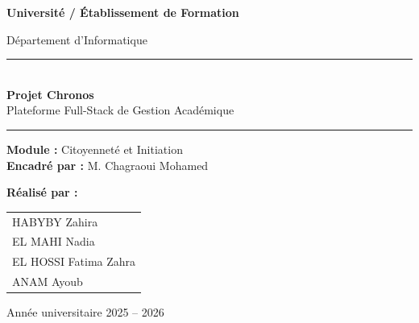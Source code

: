 \documentclass[12pt, a4paper]{report}
\begin{document}
\begin{titlepage}
    \centering
    \vspace*{2cm}
    
    {\Large\sffamily\bfseries Université / Établissement de Formation\par}
    \vspace{0.3cm}
    {\large\sffamily Département d'Informatique\par}
    
    \vspace{2cm}
    
    \rule{\textwidth}{1.5pt}\\[0.5cm]
    {\fontsize{36}{42}\selectfont\sffamily\bfseries\color{NavyBlue} Projet Chronos}\\[0.3cm]
    {\Large\sffamily Plateforme Full-Stack de Gestion Académique}\\[0.5cm]
    \rule{\textwidth}{1.5pt}
    
    \vspace{1.5cm}
    
    {\large\sffamily\bfseries Module :} {\large\sffamily Citoyenneté et Initiation}\\[0.3cm]
    {\large\sffamily\bfseries Encadré par :} {\large\sffamily M. Chagraoui Mohamed}
    
    \vspace{2cm}
    
    {\large\sffamily\bfseries Réalisé par :}\\[0.4cm]
    \begin{tabular}{l}
        \large\sffamily HABYBY Zahira \\
        \large\sffamily EL MAHI Nadia \\
        \large\sffamily EL HOSSI Fatima Zahra \\
        \large\sffamily ANAM Ayoub \\
    \end{tabular}
    
    \vfill
    
    {\large\sffamily Année universitaire 2025 -- 2026}
\end{titlepage}

\tableofcontents
\newpage

\end{document}
